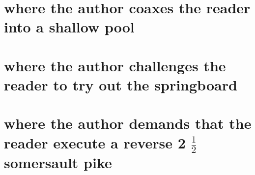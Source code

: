\documentclass{book}
\newenvironment{key point}{
\begin{quote}\bf
\begin{mdframed}[backgroundcolor=blue!20]
\begin{center}
}{
\end{center}
\end{mdframed}
\end{quote}
}
\begin{document}


\mainmatter

\part[Part I]{\normalfont where the author coaxes the reader into a shallow pool}




\part[Part II]{\normalfont where the author challenges the reader to try out the springboard}






\part[Part III]{\normalfont where the author demands that the reader execute a reverse 2 $\frac{1}{2}$ somersault pike}


%
%





\end{document}
